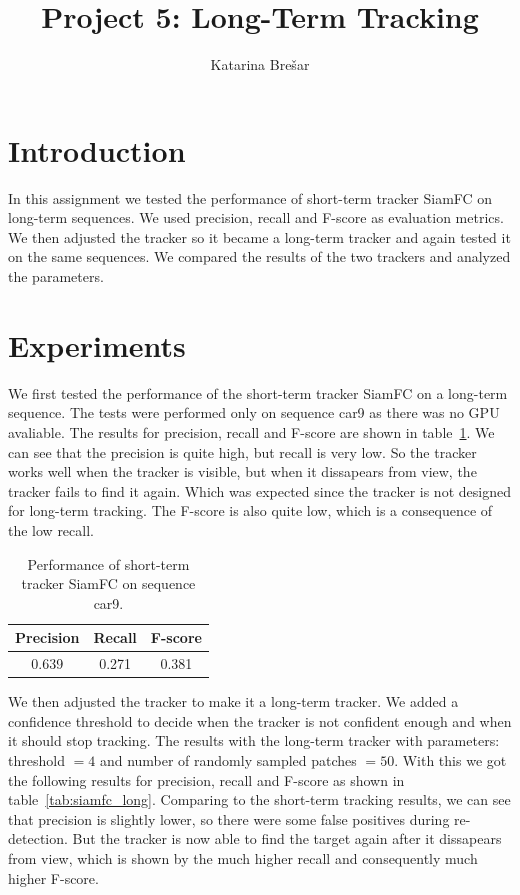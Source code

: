 \documentclass[9pt]{IEEEtran}
\title{\vspace{0ex}
Project 5: Long-Term Tracking}
\author{Katarina Brešar\vspace{-4.0ex}}
\begin{document}
\maketitle

\section{Introduction}

In this assignment we tested the performance of short-term tracker SiamFC on long-term sequences. We used precision,
recall and F-score as evaluation metrics. We then adjusted the tracker so it became a long-term tracker and again
tested it on the same sequences. We compared the results of the two trackers and analyzed the parameters.

\section{Experiments}
We first tested the performance of the short-term tracker SiamFC on a long-term sequence. The tests were performed only
on sequence car9 as there was no GPU avaliable. The results for precision, recall and F-score are shown in table~\ref{tab:siamfc_short}.
We can see that the precision is quite high, but recall is very low. So the tracker works well when the tracker is visible, but
when it dissapears from view, the tracker fails to find it again. Which was expected since the tracker is not designed for long-term tracking.
The F-score is also quite low, which is a consequence of the low recall.

\begin{table}[h!]
\centering
\begin{tabular}{|c|c|c|}
\hline
Precision & Recall & F-score \\
\hline
0.639 & 0.271 & 0.381 \\
\hline
\end{tabular}
\caption{Performance of short-term tracker SiamFC on sequence car9.}\label{tab:siamfc_short}
\end{table}

We then adjusted the tracker to make it a long-term tracker. We added a confidence threshold to decide when the tracker is not confident enough and when it should stop tracking. The results with the long-term tracker
with parameters: threshold $= 4$ and number of randomly sampled patches $=50$. With this we got the
following results for precision, recall and F-score as shown in table~\ref{tab:siamfc_long}. Comparing to the short-term
tracking results, we can see that precision is slightly lower, so there were some false positives during re-detection.
But the tracker is now able to find the target again after it dissapears from view, which is shown by the much higher
recall and consequently much higher F-score.
\end{document}
